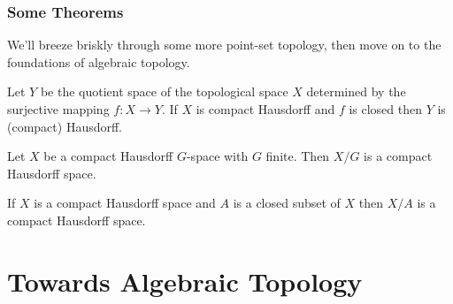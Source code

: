 \documentclass{fkbook}
\theoremstyle{snazzydefinition}
\begin{document}
\begin{adjustwidth}{1em}{1em}
  \subsection{Some Theorems}
  We'll breeze briskly through some more point-set topology, then move
  on to the foundations of algebraic topology.
  \begin{theorem}
    Let $Y$ be the quotient space of the topological space $X$
    determined by the surjective mapping $f : X \to Y$. If $X$ is
    compact Hausdorff and $f$ is closed then $Y$ is (compact)
    Hausdorff.
  \end{theorem}
  \begin{corollary}
    Let $X$ be a compact Hausdorff $G$-space with $G$ finite. Then
    $X/G$ is a compact Hausdorff space.
  \end{corollary}
  \begin{corollary}
    If $X$ is a compact Hausdorff space and $A$ is a closed subset of
    $X$ then $X/A$ is a compact Hausdorff space.
  \end{corollary}
\end{adjustwidth}

\chapter{Towards Algebraic Topology}
\end{document}

